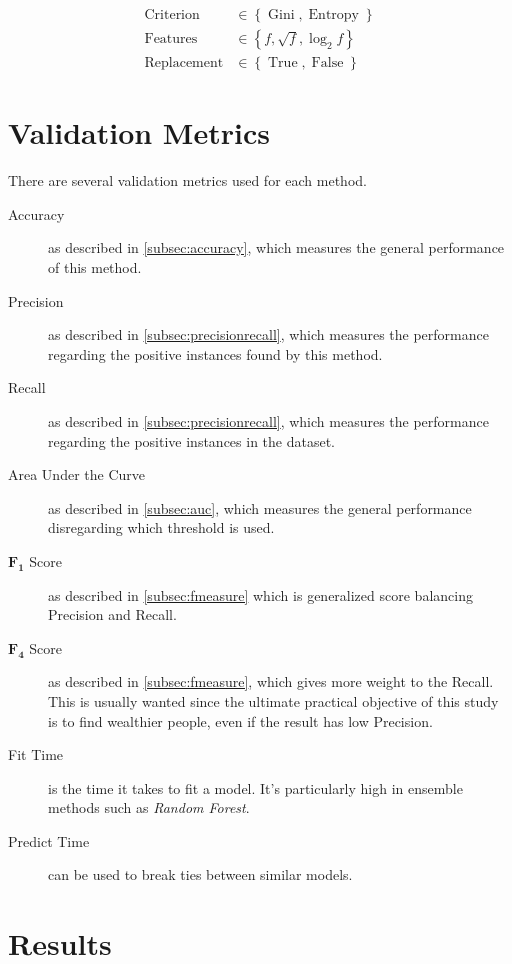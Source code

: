 \begin{equation}
\label{eq:gridsearchrandomforest}
\begin{aligned}
	\operatorname{Criterion} &\in \left\{ \operatorname{Gini}, \operatorname{Entropy} \right\} \\
	\operatorname{Features} &\in \left\{ f, \sqrt{f}, \log_2{f} \right\} \\
	\operatorname{Replacement} &\in \left\{ \operatorname{True}, \operatorname{False} \right\}
\end{aligned}
\end{equation}

\section{Validation Metrics}
\label{subsec:validationmetrics}
There are several validation metrics used for each method.

\begin{description}
	\item[Accuracy] as described in \cref{subsec:accuracy}, which measures the general performance of this method.
	\item[Precision] as described in \cref{subsec:precisionrecall}, which measures the performance regarding the positive instances found by this method.
	\item[Recall] as described in \cref{subsec:precisionrecall}, which measures the performance regarding the positive instances in the dataset.
	\item[Area Under the Curve] as described in \cref{subsec:auc}, which measures the general performance disregarding which threshold is used.
	\item[$\mathbf{F_1}$ Score] as described in \cref{subsec:fmeasure} which is generalized score balancing Precision and Recall.
	\item[$\mathbf{F_4}$ Score] as described in \cref{subsec:fmeasure}, which gives more weight to the Recall. This is usually wanted since the ultimate practical objective of this study is to find wealthier people, even if the result has low Precision.
	\item[Fit Time] is the time it takes to fit a model. It's particularly high in ensemble methods such as \emph{Random Forest}.
	\item[Predict Time] can be used to break ties between similar models.
\end{description}

\section{Results}
\label{sec:comparison_results}

